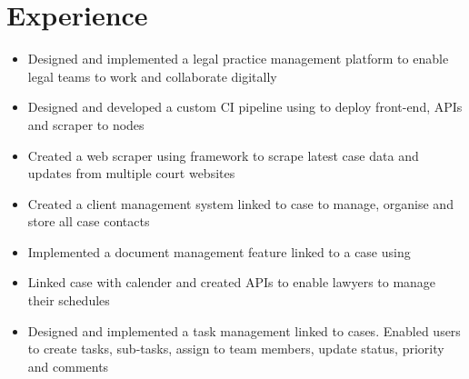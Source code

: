 \documentclass[]{resume}
\begin{document}
\begin{minipage}[t]{0.33\textwidth}

%
%

\end{minipage} 
\hfill
\begin{minipage}[t]{0.66\textwidth} 


\section{Experience}

\begin{itemize}
    \item Designed and implemented a legal practice management platform to enable legal teams to work and collaborate digitally
    \item Designed and developed a custom CI pipeline using  to deploy front-end, APIs and scraper to  nodes
    \item Created a web scraper using  framework to scrape latest case data and updates from multiple court websites
    \item Created a client management system linked to case to manage, organise and store all case contacts
    \item Implemented a document management feature linked to a case using 
    \item Linked case with calender and created APIs to enable lawyers to manage their schedules
    \item Designed and implemented a task management linked to cases. Enabled users to create tasks, sub-tasks, assign to team members, update status, priority and comments
\end{itemize}
\sectionsep


\end{minipage}
\end{document}
